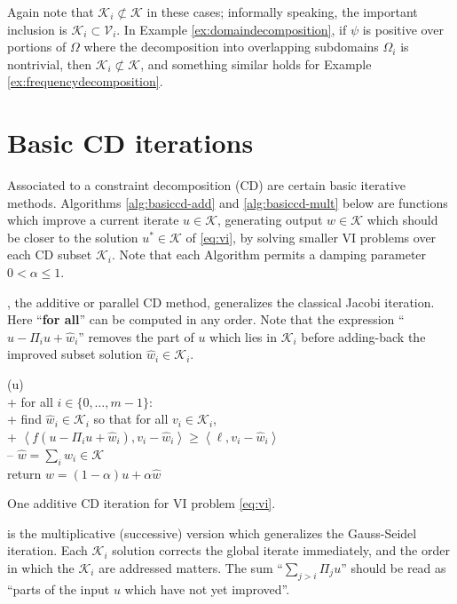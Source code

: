 \documentclass[letterpaper,final,12pt,reqno]{amsart}
\theoremstyle{cstyle}
\theoremstyle{cstyle*}
\theoremstyle{dstyle}
\numberwithin{equation}{section}
\numberwithin{figure}{section}
\numberwithin{table}{section}
\numberwithin{theorem}{section}
\newcommand{\cK}{\mathcal{K}}
\newcommand{\cV}{\mathcal{V}}
\newcommand{\ip}[2]{\left<#1,#2\right>}
\begin{document}
Again note that $\cK_i \not\subset \cK$ in these cases; informally speaking, the important inclusion is $\cK_i \subset \cV_i$.  In Example \ref{ex:domaindecomposition}, if $\psi$ is positive over portions of $\Omega$ where the decomposition into overlapping subdomains $\Omega_i$ is nontrivial, then $\cK_i \not\subset \cK$, and something similar holds for Example \ref{ex:frequencydecomposition}.


\section{Basic CD iterations} \label{sec:cditers}

Associated to a constraint decomposition (CD) are certain basic iterative methods.  Algorithms \ref{alg:basiccd-add} and \ref{alg:basiccd-mult} below are functions which improve a current iterate $u \in \cK$, generating output $w\in\cK$ which should be closer to the solution $u^* \in \cK$ of \eqref{eq:vi}, by solving smaller VI problems over each CD subset $\cK_i$.  Note that each Algorithm permits a damping parameter $0<\alpha\le 1$.

, the additive or parallel CD method, generalizes the classical Jacobi iteration.  Here ``\textbf{for all}'' can be computed in any order.  Note that the expression ``$u-\Pi_iu+\hat w_i$'' removes the part of $u$ which lies in $\mathcal{K}_i$ before adding-back the improved subset solution $\hat w_i \in \mathcal{K}_i$.

\begin{pseudofloat}[H]
\begin{pseudo*}
(u)\text{:} \\+
    for all $i \in \{0,\dots,m-1\}$: \\+
        \rm{find} $\hat w_i\in \cK_i$ \rm{so that for all} $v_i\in \cK_i$, \\+
            $\boxed{\ip{f(u - \Pi_i u + \hat w_i)}{v_i-\hat w_i} \ge \ip{\ell}{v_i-\hat w_i}}$ \\--
    $\hat w = \sum_i \hat w_i\in\cK$ \\
    return $w=(1-\alpha) u + \alpha \hat w$
\end{pseudo*}
\caption{One additive CD iteration for VI problem \eqref{eq:vi}.}
\label{alg:basiccd-add}
\end{pseudofloat}

 is the multiplicative (successive) version which generalizes the Gauss-Seidel iteration.  Each $\mathcal{K}_i$ solution corrects the global iterate immediately, and the order in which the $\mathcal{K}_i$ are addressed matters.  The sum ``$\sum_{j>i} \Pi_j u$'' should be read as ``parts of the input $u$ which have not yet improved''.
\end{document}
